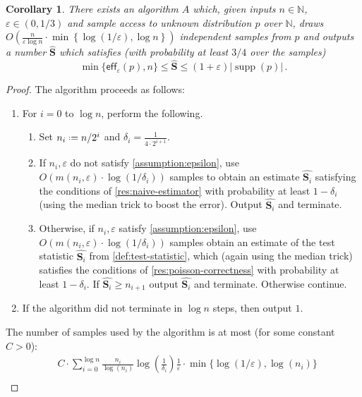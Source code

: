 \documentclass[10pt,a4paper]{article}
\newtheorem{corollary}{Corollary}[section]
\DeclareMathOperator{\supp}{supp}   %
\newcommand*{\define}{\mathrel{\vcenter{\baselineskip0.5ex \lineskiplimit0pt
                      \hbox{\scriptsize.}\hbox{\scriptsize.}}}%
                      =}
\newcommand{\bN}{\ensuremath{\mathbb{N}}}
\newcommand{\eff}{\mathsf{eff}}
\renewcommand{\epsilon}{\varepsilon}
\begin{document}
\begin{corollary}
    There exists an algorithm $A$ which, given inputs $n \in \bN$, $\epsilon \in (0,1/3)$ and sample
    access to unknown distribution $p$ over $\bN$, draws $O\left(\frac{n}{\epsilon \log n} \cdot
    \min\left\{ \log(1/\epsilon), \log n \right\} \right)$ independent samples from $p$ and outputs
    a number $\widehat{\bm S}$ which satisfies (with probability at least $3/4$ over the samples)
\[
  \min\{ \eff_\epsilon(p), n\} \leq \widehat{\bm{S}} \leq (1+\epsilon)|\supp(p)| \,.
\]
\end{corollary}
\begin{proof}
The algorithm proceeds as follows:
\begin{enumerate}
\item For $i=0$ to $\log n$, perform the following.
\begin{enumerate}
\item Set $n_i \define n/2^i$ and $\delta_i = \tfrac{1}{4 \cdot 2^{i+1}}$.
\item If $n_i, \epsilon$ do not satisfy \cref{assumption:epsilon}, use $O(m(n_i, \epsilon) \cdot
    \log(1/\delta_i))$ samples to obtain an estimate $\widehat{\bm{S}_i}$ satisfying the conditions
    of \cref{res:naive-estimator} with probability at least $1-\delta_i$ (using the median trick to
    boost the error). Output $\widehat{\bm{S}_i}$ and terminate.
\item Otherwise, if $n_i, \epsilon$ satisfy \cref{assumption:epsilon}, use $O(m(n_i, \epsilon) \cdot
    \log(1/\delta_i))$ samples obtain an estimate of the test statistic $\widehat{\bm{S}_i}$ from
    \cref{def:test-statistic}, which (again using the median trick) satisfies the conditions of
    \cref{res:poisson-correctness} with probability at least $1-\delta_i$. If $\widehat{\bm{S}_i}
    \geq n_{i+1}$ output $\widehat{\bm{S}_i}$ and terminate. Otherwise continue.
\end{enumerate}
\item If the algorithm did not terminate in $\log n$ steps, then output $1$.
\end{enumerate}
The number of samples used by the algorithm is at most (for some constant $C > 0$):
\begin{align*}
&C \cdot \sum_{i=0}^{\log n} \frac{n_i}{\log(n_i)} \log\left(\frac{1}{\delta_i}\right)
\frac{1}{\epsilon} \cdot \min\{ \log(1/\epsilon), \log(n_i) \} \\

\end{align*}
\end{proof}
\end{document}
